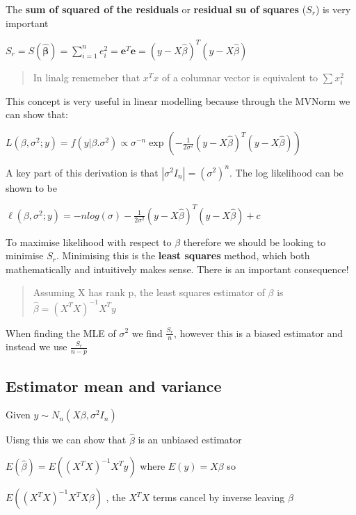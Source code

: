 \documentclass[
  letterpaper,
  DIV=11,
  numbers=noendperiod]{scrreprt}
\begin{document}
The \textbf{sum of squared of the residuals} or \textbf{residual su of
squares} (\(S_r\)) is very important

\(S_r = S(\hat{\boldsymbol{\beta}}) = \sum_{i=1}^n e_i^2 =\textbf{e}^T\textbf{e} = (y - X\hat{\beta})^T(y - X\hat{\beta})\)

\begin{quote}
In linalg rememeber that \(x^Tx\) of a columnar vector is equivalent to
\(\sum x^2_i\)
\end{quote}

This concept is very useful in linear modelling because through the
MVNorm we can show that:

\(L(\beta, \sigma^2 ; y) = f(y|\beta. \sigma^2) \propto \sigma^{-n}\exp(- \frac{1}{2\sigma^2}(y - X\hat{\beta})^T(y - X\hat{\beta}))\)

A key part of this derivation is that \(|\sigma^2I_n| = (\sigma^2)^n\).
The log likelihood can be shown to be

\(\ell(\beta, \sigma^2;y) = -nlog(\sigma) - \frac{1}{2\sigma^2}(y - X\hat{\beta})^T(y - X\hat{\beta}) + c\)

To maximise likelihood with respect to \(\beta\) therefore we should be
looking to minimise \(S_r\). Minimising this is the \textbf{least
squares} method, which both mathematically and intuitively makes sense.
There is an important consequence!

\begin{quote}
Assuming X has rank p, the least squares estimator of \(\beta\) is
\(\hat{\beta} = (X^TX)^{-1}X^Ty\)
\end{quote}

When finding the MLE of \(\sigma^2\) we find \(\frac{S_r}{n}\), however
this is a biased estimator and instead we use \(\frac{S_r}{n-p}\)

\hypertarget{estimator-mean-and-variance}{%
\subsection{Estimator mean and
variance}\label{estimator-mean-and-variance}}

Given \(y \sim N_n(X\beta, \sigma^2I_n)\)

Uisng this we can show that \(\hat{\beta}\) is an unbiased estimator

\(E(\hat{\beta}) = E((X^TX)^{-1}X^Ty)\) where \(E(y) = X\beta\) so

\(E((X^TX)^{-1}X^TX\beta)\) , the \(X^TX\) terms cancel by inverse
leaving \(\beta\)
\end{document}

